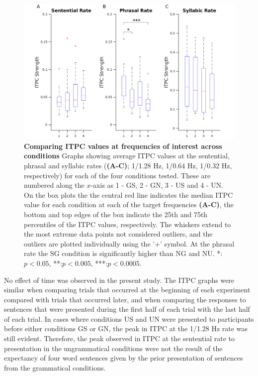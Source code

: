 \documentclass[a4paper,10pt,twoside]{article}
\begin{document}
{\begin{figure}[tbp]
\includegraphics[width=\linewidth]{ITPC_peaks.png}
\caption{\textbf{Comparing ITPC values at frequencies of interest
    across conditions} Graphs showing average ITPC values at the
  sentential, phrasal and syllabic rates (\textbf{(A-C)}; 1/1.28 Hz,
  1/0.64 Hz, 1/0.32 Hz, respectively) for each of the four conditions
  tested. These are numbered along the $x$-axis as 1 - GS, 2 - GN, 3 -
  US and 4 - UN.  On the box plots the the central red line indicates
  the median ITPC value for each condition at each of the target
  frequencies \textbf{(A-C)}, the bottom and top edges of the box
  indicate the 25th and 75th percentiles of the ITPC values,
  respectively. The whiskers extend to the most extreme data points
  not considered outliers, and the outliers are plotted individually
  using the '+' symbol.  At the phrasal rate the SG condition is
  significantly higher than NG and NU. *:$p<0.05$, **:$p<0.005$,
  ***:$p<0.0005$. }
\label{ITPC_peaks}
\end{figure}

No effect of time was observed in the present study. The ITPC graphs
were similar when comparing trials that occurred at the beginning of
each experiment compared with trials that occurred later, and when
comparing the responses to sentences that were presented during the
first half of each trial with the last half of each trial. In cases
where conditions US and UN were presented to participants before
either conditions GS or GN, the peak in ITPC at the 1/1.28 Hz rate was
still evident. Therefore, the peak observed in ITPC at the sentential
rate to presentation in the ungrammatical conditions were not the
result of the expectancy of four word sentences given by the prior
presentation of sentences from the grammatical conditions.

}
\end{document}
